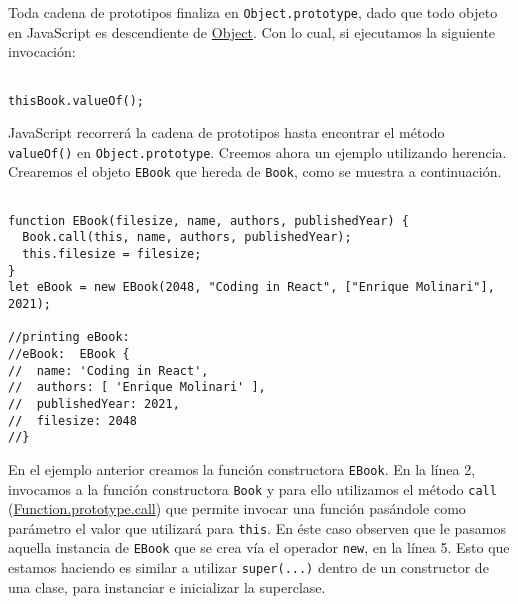 \documentclass[a4paper, oneside, titlepage, 12pt]{paper}
\begin{document}
Toda cadena de prototipos finaliza en \texttt{Object.prototype}, dado que todo objeto en JavaScript es descendiente de \href{https://developer.mozilla.org/es/docs/Web/JavaScript/Reference/Global_Objects/Object}{Object}. Con lo cual, si ejecutamos la siguiente invocación:

\begin{verbatim}

thisBook.valueOf();
\end{verbatim}

JavaScript recorrerá la cadena de prototipos hasta encontrar el método \texttt{valueOf()} en \texttt{Object.prototype}. Creemos ahora un ejemplo utilizando herencia. Crearemos el objeto \texttt{EBook} que hereda de \texttt{Book}, como se muestra a continuación.

\begin{verbatim}

function EBook(filesize, name, authors, publishedYear) {
  Book.call(this, name, authors, publishedYear);
  this.filesize = filesize;
}
let eBook = new EBook(2048, "Coding in React", ["Enrique Molinari"], 2021);

//printing eBook:
//eBook:  EBook {
//  name: 'Coding in React',
//  authors: [ 'Enrique Molinari' ],
//  publishedYear: 2021,
//  filesize: 2048
//}
\end{verbatim}

En el ejemplo anterior creamos la función constructora \texttt{EBook}. En la línea 2, invocamos a la función constructora \texttt{Book} y para ello utilizamos el método \texttt{call} (\href{https://developer.mozilla.org/es/docs/Web/JavaScript/Reference/Global_Objects/Function/call}{Function.prototype.call}) que permite invocar una función pasándole como parámetro el valor que utilizará para \texttt{this}. En éste caso observen que le pasamos aquella instancia de \texttt{EBook} que se crea vía el operador \texttt{new}, en la línea 5. Esto que estamos haciendo es similar a utilizar \texttt{super(...)} dentro de un constructor de una clase, para instanciar e inicializar la superclase. 
\newline
\end{document}
